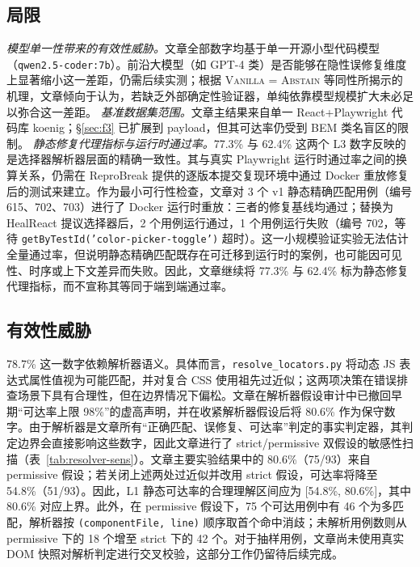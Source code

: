 \subsection{局限}
\textit{模型单一性带来的有效性威胁。}文章全部数字均基于单一开源小型代码模型（\texttt{qwen2.5-coder:7b}）。前沿大模型（如 GPT-4 类）是否能够在隐性误修复维度上显著缩小这一差距，仍需后续实测；根据 \textsc{Vanilla = Abstain} 等同性所揭示的机理，文章倾向于认为，若缺乏外部确定性验证器，单纯依靠模型规模扩大未必足以弥合这一差距。
\textit{基准数据集范围。}文章主结果来自单一 React+Playwright 代码库 koenig；\S\ref{sec:f3} 已扩展到 payload，但其可达率仍受到 BEM 类名盲区的限制。
\textit{静态修复代理指标与运行时通过率。}77.3\% 与 62.4\% 这两个 L3 数字反映的是选择器解析器层面的精确一致性。其与真实 Playwright 运行时通过率之间的换算关系，仍需在 ReproBreak 提供的逐版本提交复现环境中通过 Docker 重放修复后的测试来建立。作为最小可行性检查，文章对 3 个 v1 静态精确匹配用例（编号 615、702、703）进行了 Docker 运行时重放：三者的修复基线均通过；替换为 HealReact 提议选择器后，2 个用例运行通过，1 个用例运行失败（编号 702，等待 \texttt{getByTestId('color-picker-toggle')} 超时）。这一小规模验证实验无法估计全量通过率，但说明静态精确匹配既存在可迁移到运行时的案例，也可能因可见性、时序或上下文差异而失败。因此，文章继续将 77.3\% 与 62.4\% 标为静态修复代理指标，而不宣称其等同于端到端通过率。

\subsection{有效性威胁}
78.7\% 这一数字依赖解析器语义。具体而言，\texttt{resolve\_locators.py} 将动态 JS 表达式属性值视为可能匹配，并对复合 CSS 使用祖先过近似；这两项决策在错误排查场景下具有合理性，但在边界情况下偏松。文章在解析器假设审计中已撤回早期“可达率上限 98\%”的虚高声明，并在收紧解析器假设后将 80.6\% 作为保守数字。由于解析器是文章所有“正确匹配、误修复、可达率”判定的事实判定器，其判定边界会直接影响这些数字，因此文章进行了 strict/permissive 双假设的敏感性扫描（表~\ref{tab:resolver-sens}）。文章主要实验结果中的 80.6\%（75/93）来自 permissive 假设；若关闭上述两处过近似并改用 strict 假设，可达率将降至 54.8\%（51/93）。因此，L1 静态可达率的合理理解区间应为 [54.8\%, 80.6\%]，其中 80.6\% 对应上界。此外，在 permissive 假设下，75 个可达用例中有 46 个为多匹配，解析器按 \texttt{(componentFile, line)} 顺序取首个命中消歧；未解析用例数则从 permissive 下的 18 个增至 strict 下的 42 个。对于抽样用例，文章尚未使用真实 DOM 快照对解析判定进行交叉校验，这部分工作仍留待后续完成。

